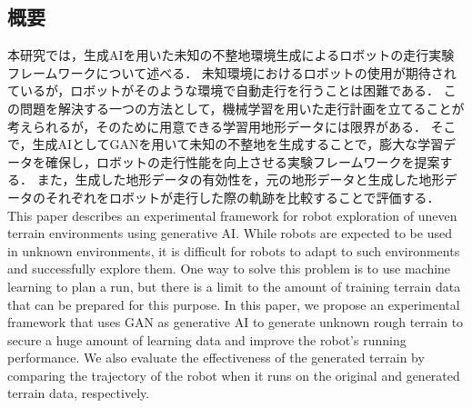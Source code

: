 \begin{center}
    {\section*{概要}}
\end{center}

本研究では，生成AIを用いた未知の不整地環境生成によるロボットの走行実験フレームワークについて述べる．
未知環境におけるロボットの使用が期待されているが，ロボットがそのような環境で自動走行を行うことは困難である．
この問題を解決する一つの方法として，機械学習を用いた走行計画を立てることが考えられるが，そのために用意できる学習用地形データには限界がある．
そこで，生成AIとしてGANを用いて未知の不整地を生成することで，膨大な学習データを確保し，ロボットの走行性能を向上させる実験フレームワークを提案する．
また，生成した地形データの有効性を，元の地形データと生成した地形データのそれぞれをロボットが走行した際の軌跡を比較することで評価する．
\\

This paper describes an experimental framework for robot exploration of uneven terrain environments using generative AI.
While robots are expected to be used in unknown environments, it is difficult for robots to adapt to such environments and successfully explore them.
One way to solve this problem is to use machine learning to plan a run, but there is a limit to the amount of training terrain data that can be prepared for this purpose.
In this paper, we propose an experimental framework that uses GAN as generative AI to generate unknown rough terrain to secure a huge amount of learning data and improve the robot's running performance.
We also evaluate the effectiveness of the generated terrain by comparing the trajectory of the robot when it runs on the original and generated terrain data, respectively.
